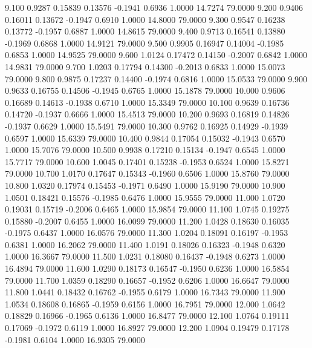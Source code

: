    9.100   0.9287   0.15839   0.13576  -0.1941   0.6936   1.0000  14.7274  79.0000
   9.200   0.9406   0.16011   0.13672  -0.1947   0.6910   1.0000  14.8000  79.0000
   9.300   0.9547   0.16238   0.13772  -0.1957   0.6887   1.0000  14.8615  79.0000
   9.400   0.9713   0.16541   0.13880  -0.1969   0.6868   1.0000  14.9121  79.0000
   9.500   0.9905   0.16947   0.14004  -0.1985   0.6853   1.0000  14.9525  79.0000
   9.600   1.0124   0.17472   0.14150  -0.2007   0.6842   1.0000  14.9831  79.0000
   9.700   1.0203   0.17794   0.14300  -0.2013   0.6833   1.0000  15.0073  79.0000
   9.800   0.9875   0.17237   0.14400  -0.1974   0.6816   1.0000  15.0533  79.0000
   9.900   0.9633   0.16755   0.14506  -0.1945   0.6765   1.0000  15.1878  79.0000
  10.000   0.9606   0.16689   0.14613  -0.1938   0.6710   1.0000  15.3349  79.0000
  10.100   0.9639   0.16736   0.14720  -0.1937   0.6666   1.0000  15.4513  79.0000
  10.200   0.9693   0.16819   0.14826  -0.1937   0.6629   1.0000  15.5491  79.0000
  10.300   0.9762   0.16925   0.14929  -0.1939   0.6597   1.0000  15.6339  79.0000
  10.400   0.9844   0.17054   0.15032  -0.1943   0.6570   1.0000  15.7076  79.0000
  10.500   0.9938   0.17210   0.15134  -0.1947   0.6545   1.0000  15.7717  79.0000
  10.600   1.0045   0.17401   0.15238  -0.1953   0.6524   1.0000  15.8271  79.0000
  10.700   1.0170   0.17647   0.15343  -0.1960   0.6506   1.0000  15.8760  79.0000
  10.800   1.0320   0.17974   0.15453  -0.1971   0.6490   1.0000  15.9190  79.0000
  10.900   1.0501   0.18421   0.15576  -0.1985   0.6476   1.0000  15.9555  79.0000
  11.000   1.0720   0.19031   0.15719  -0.2006   0.6465   1.0000  15.9854  79.0000
  11.100   1.0745   0.19275   0.15880  -0.2007   0.6455   1.0000  16.0099  79.0000
  11.200   1.0428   0.18630   0.16035  -0.1975   0.6437   1.0000  16.0576  79.0000
  11.300   1.0204   0.18091   0.16197  -0.1953   0.6381   1.0000  16.2062  79.0000
  11.400   1.0191   0.18026   0.16323  -0.1948   0.6320   1.0000  16.3667  79.0000
  11.500   1.0231   0.18080   0.16437  -0.1948   0.6273   1.0000  16.4894  79.0000
  11.600   1.0290   0.18173   0.16547  -0.1950   0.6236   1.0000  16.5854  79.0000
  11.700   1.0359   0.18290   0.16657  -0.1952   0.6206   1.0000  16.6647  79.0000
  11.800   1.0441   0.18432   0.16762  -0.1955   0.6179   1.0000  16.7343  79.0000
  11.900   1.0534   0.18608   0.16865  -0.1959   0.6156   1.0000  16.7951  79.0000
  12.000   1.0642   0.18829   0.16966  -0.1965   0.6136   1.0000  16.8477  79.0000
  12.100   1.0764   0.19111   0.17069  -0.1972   0.6119   1.0000  16.8927  79.0000
  12.200   1.0904   0.19479   0.17178  -0.1981   0.6104   1.0000  16.9305  79.0000
